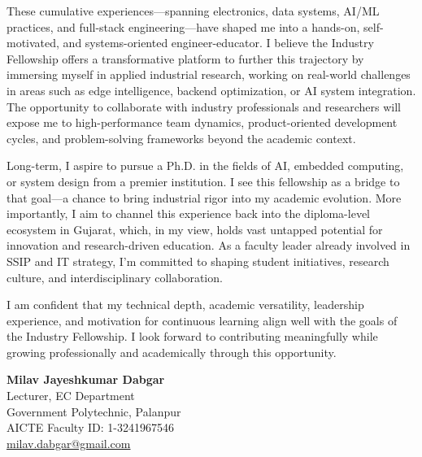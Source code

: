 \documentclass[12pt,a4paper]{article}
\begin{document}
These cumulative experiences—spanning electronics, data systems, AI/ML practices, and full-stack engineering—have shaped me into a hands-on, self-motivated, and systems-oriented engineer-educator. I believe the Industry Fellowship offers a transformative platform to further this trajectory by immersing myself in applied industrial research, working on real-world challenges in areas such as edge intelligence, backend optimization, or AI system integration. The opportunity to collaborate with industry professionals and researchers will expose me to high-performance team dynamics, product-oriented development cycles, and problem-solving frameworks beyond the academic context.

Long-term, I aspire to pursue a Ph.D. in the fields of AI, embedded computing, or system design from a premier institution. I see this fellowship as a bridge to that goal—a chance to bring industrial rigor into my academic evolution. More importantly, I aim to channel this experience back into the diploma-level ecosystem in Gujarat, which, in my view, holds vast untapped potential for innovation and research-driven education. As a faculty leader already involved in SSIP and IT strategy, I'm committed to shaping student initiatives, research culture, and interdisciplinary collaboration.

I am confident that my technical depth, academic versatility, leadership experience, and motivation for continuous learning align well with the goals of the Industry Fellowship. I look forward to contributing meaningfully while growing professionally and academically through this opportunity.

\vspace{20pt}

\begin{flushright}
\begin{minipage}{0.4\textwidth}
    \textbf{Milav Jayeshkumar Dabgar} \\
    Lecturer, EC Department \\
    Government Polytechnic, Palanpur \\
    AICTE Faculty ID: 1-3241967546 \\
    \href{mailto:milav.dabgar@gmail.com}{\color{primary}milav.dabgar@gmail.com}
\end{minipage}
\end{flushright}
\end{document}
